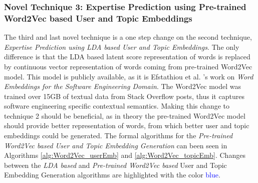         \subsubsection{Novel Technique 3: Expertise Prediction using Pre-trained Word2Vec based User and Topic Embeddings}
        
            The third and last novel technique is a one step change on the second technique, \emph{Expertise Prediction using LDA based User and Topic Embeddings}. The only difference is that the LDA based latent score representation of words is replaced by continuous vector representation of words coming from pre-trained Word2Vec model. This model is publicly available, as it is Efstathiou et al. \cite{efstathiou2018word}'s work on \emph{Word Embeddings for the Software Engineering Domain}. The Word2Vec model \cite{mikolov2013efficient} was trained over 15GB of textual data from Stack Overflow posts, thus it captures software engineering specific contextual semantics. Making this change to technique 2 should be beneficial, as in theory the pre-trained Word2Vec model should provide better representation of words, from which better user and topic embeddings could be generated. The formal algorithms for the \emph{Pre-trained Word2Vec based User and Topic Embedding Generation} can been seen in Algorithms \ref{alg:Word2Vec_userEmb} and \ref{alg:Word2Vec_topicEmb}. Changes between the \emph{LDA based} and \emph{Pre-trained Word2Vec based} User and Topic Embedding Generation algorithms are highlighted with the color \textcolor{blue}{blue}. 
        
